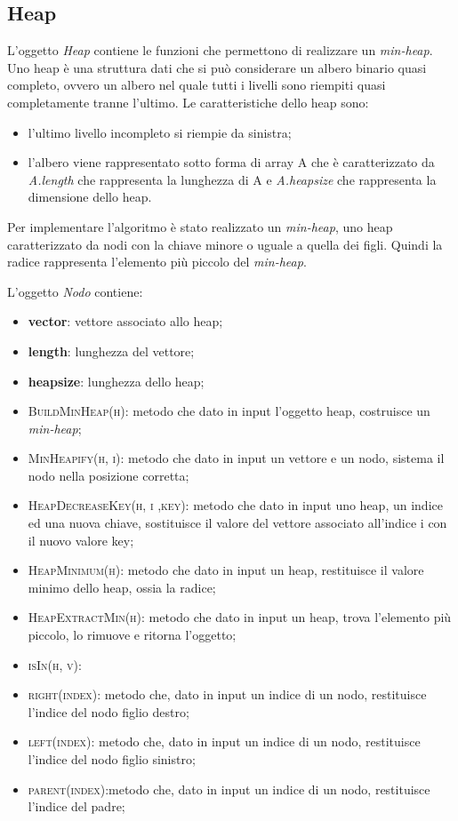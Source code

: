 \newpage

\subsection{Heap}
\label{Heap}

L'oggetto \textit{Heap} contiene le funzioni che permettono di realizzare un \textit{min-heap}. Uno heap è una struttura dati che si può considerare un albero binario quasi completo, ovvero un albero nel quale tutti i livelli sono riempiti quasi completamente tranne l'ultimo. Le caratteristiche dello heap sono:

\begin{itemize}
    \item l'ultimo livello incompleto si riempie da sinistra;
    \item l'albero viene rappresentato sotto forma di array A che è caratterizzato da \textit{A.length} che rappresenta la lunghezza di A e \textit{A.heapsize} che rappresenta la dimensione dello heap.
\end{itemize}

Per implementare l'algoritmo è stato realizzato un \textit{min-heap}, uno heap caratterizzato da nodi con la chiave minore o uguale a quella dei figli. Quindi la radice rappresenta l'elemento più piccolo del \textit{min-heap}.

L'oggetto \textit{Nodo} contiene:

\begin{itemize}
    \item \textbf{vector}: vettore associato allo heap;
    \item \textbf{length}: lunghezza del vettore;
    \item \textbf{heapsize}: lunghezza dello heap;
    \item \textsc{BuildMinHeap(h)}: metodo che dato in input l'oggetto heap, costruisce un \textit{min-heap};
    \item \textsc{MinHeapify(h, i)}: metodo che dato in input un vettore e un nodo, sistema il nodo nella posizione corretta;
    \item \textsc{HeapDecreaseKey(h, i ,key)}: metodo che dato in input uno heap, un indice ed una nuova chiave, sostituisce il valore del vettore associato all'indice i con il nuovo valore key;
    \item \textsc{HeapMinimum(h)}: metodo che dato in input un heap, restituisce il valore minimo dello heap, ossia la radice;
    \item \textsc{HeapExtractMin(h)}: metodo che dato in input un heap, trova l'elemento più piccolo, lo rimuove e ritorna l'oggetto;
    \item \textsc{isIn(h, v)}:
    \item \textsc{right(index)}: metodo che, dato in input un indice di un nodo, restituisce l'indice del nodo figlio destro;
    \item \textsc{left(index)}: metodo che, dato in input un indice di un nodo, restituisce l'indice del nodo figlio sinistro;
    \item \textsc{parent(index)}:metodo che, dato in input un indice di un nodo, restituisce l'indice del padre;
\end{itemize}


